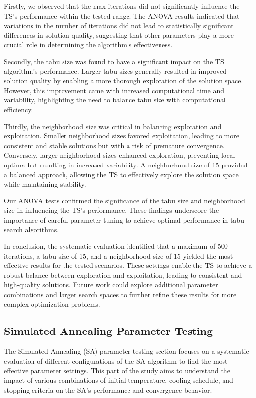 \documentclass{article}
\begin{document}
    Firstly, we observed that the max iterations did not significantly influence the TS’s performance within the tested range. The ANOVA results indicated that variations in the number of iterations did not lead to statistically significant differences in solution quality, suggesting that other parameters play a more crucial role in determining the algorithm's effectiveness.

    Secondly, the tabu size was found to have a significant impact on the TS algorithm's performance. Larger tabu sizes generally resulted in improved solution quality by enabling a more thorough exploration of the solution space. However, this improvement came with increased computational time and variability, highlighting the need to balance tabu size with computational efficiency.

    Thirdly, the neighborhood size was critical in balancing exploration and exploitation. Smaller neighborhood sizes favored exploitation, leading to more consistent and stable solutions but with a risk of premature convergence. Conversely, larger neighborhood sizes enhanced exploration, preventing local optima but resulting in increased variability. A neighborhood size of 15 provided a balanced approach, allowing the TS to effectively explore the solution space while maintaining stability.

    Our ANOVA tests confirmed the significance of the tabu size and neighborhood size in influencing the TS’s performance. These findings underscore the importance of careful parameter tuning to achieve optimal performance in tabu search algorithms.

    In conclusion, the systematic evaluation identified that a maximum of 500 iterations, a tabu size of 15, and a neighborhood size of 15 yielded the most effective results for the tested scenarios. These settings enable the TS to achieve a robust balance between exploration and exploitation, leading to consistent and high-quality solutions. Future work could explore additional parameter combinations and larger search spaces to further refine these results for more complex optimization problems.

    \newpage


    \subsection{Simulated Annealing Parameter Testing}

    The Simulated Annealing (SA) parameter testing section focuses on a systematic evaluation of different configurations of the SA algorithm to find the most effective parameter settings.
    This part of the study aims to understand the impact of various combinations of initial temperature, cooling schedule, and stopping criteria on the SA’s performance and convergence behavior.
\end{document}
